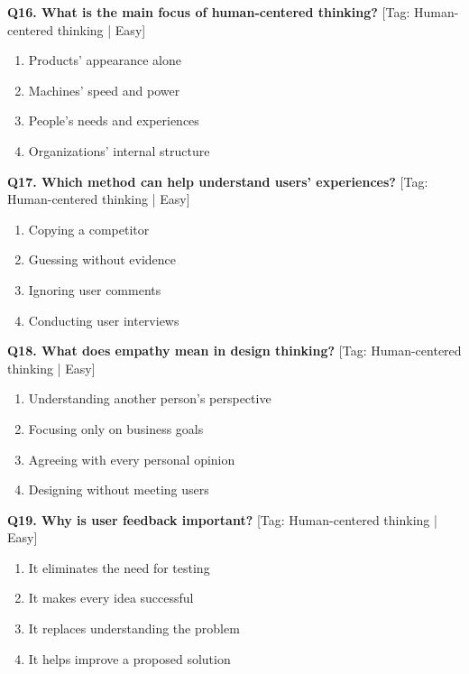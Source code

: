 \noindent\textbf{Q16. What is the main focus of human-centered thinking?} \hfill [Tag: Human-centered thinking | Easy]
\begin{enumerate}[label=(\alph*),topsep=2pt,itemsep=1pt,partopsep=0pt,parsep=0pt]
    \item {Products' appearance alone}
    \item {Machines' speed and power}
    \item {People's needs and experiences}
    \item {Organizations' internal structure}
\end{enumerate}
\vspace{2mm}

\noindent\textbf{Q17. Which method can help understand users' experiences?} \hfill [Tag: Human-centered thinking | Easy]
\begin{enumerate}[label=(\alph*),topsep=2pt,itemsep=1pt,partopsep=0pt,parsep=0pt]
    \item {Copying a competitor}
    \item {Guessing without evidence}
    \item {Ignoring user comments}
    \item {Conducting user interviews}
\end{enumerate}
\vspace{2mm}

\noindent\textbf{Q18. What does empathy mean in design thinking?} \hfill [Tag: Human-centered thinking | Easy]
\begin{enumerate}[label=(\alph*),topsep=2pt,itemsep=1pt,partopsep=0pt,parsep=0pt]
    \item {Understanding another person's perspective}
    \item {Focusing only on business goals}
    \item {Agreeing with every personal opinion}
    \item {Designing without meeting users}
\end{enumerate}
\vspace{2mm}

\noindent\textbf{Q19. Why is user feedback important?} \hfill [Tag: Human-centered thinking | Easy]
\begin{enumerate}[label=(\alph*),topsep=2pt,itemsep=1pt,partopsep=0pt,parsep=0pt]
    \item {It eliminates the need for testing}
    \item {It makes every idea successful}
    \item {It replaces understanding the problem}
    \item {It helps improve a proposed solution}
\end{enumerate}
\vspace{2mm}

